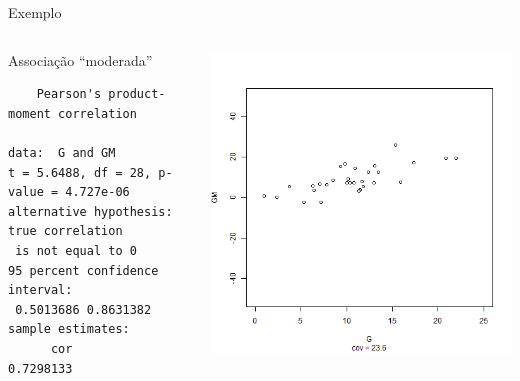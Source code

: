 \documentclass{beamer}
\begin{document}
\begin{frame}[fragile]{\scriptsize Exemplo}
  \begin{columns}
    \begin{column}{6cm}
      \begin{exampleblock}{Associação ``moderada''}
        \tiny
\begin{verbatim}
	Pearson's product-moment correlation

data:  G and GM
t = 5.6488, df = 28, p-value = 4.727e-06
alternative hypothesis: true correlation
 is not equal to 0
95 percent confidence interval:
 0.5013686 0.8631382
sample estimates:
      cor 
0.7298133
\end{verbatim}
    \end{exampleblock}
   \end{column}
    \begin{column}{4cm}
  \begin{center}
    \includegraphics[height=.8\textheight]{Cap17/anim-2}
  \end{center}
    \end{column}
\end{columns}
\end{frame}
\end{document}
